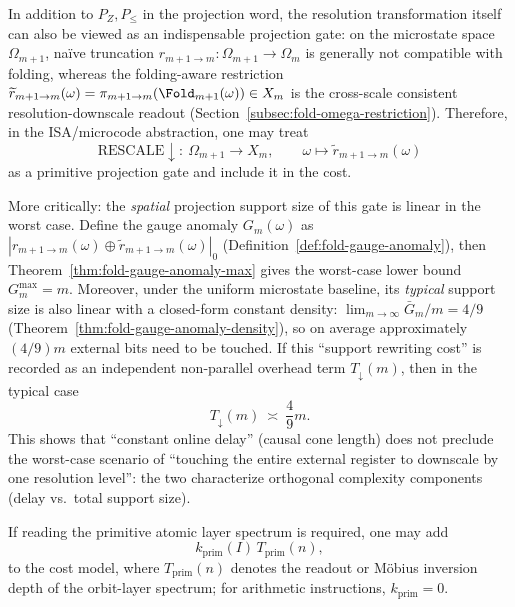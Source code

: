 \begin{remark}\label{rem:pom-rescale-gauge-anomaly}
In addition to \(P_Z,P_{\le}\) in the projection word, the resolution transformation itself can also be viewed as an indispensable projection gate: on the microstate space \(\Omega_{m+1}\), na\"ive truncation
\(
r_{m+1\to m}:\Omega_{m+1}\to\Omega_m
\)
is generally not compatible with folding, whereas the folding-aware restriction
\(
\widetilde r_{m+1\to m}(\omega)=\pi_{m+1\to m}(\Fold_{m+1}(\omega))\in X_m
\)
is the cross-scale consistent resolution-downscale readout (Section~\ref{subsec:fold-omega-restriction}).
Therefore, in the ISA/microcode abstraction, one may treat
$$
\mathrm{RESCALE}\downarrow:\ \Omega_{m+1}\to X_m,\qquad \omega\mapsto \widetilde r_{m+1\to m}(\omega)
$$
as a primitive projection gate and include it in the cost.
\par
More critically: the \emph{spatial} projection support size of this gate is linear in the worst case. Define the gauge anomaly \(G_m(\omega)\) as
\(
|r_{m+1\to m}(\omega)\oplus \widetilde r_{m+1\to m}(\omega)|_0
\)
(Definition~\ref{def:fold-gauge-anomaly}), then Theorem~\ref{thm:fold-gauge-anomaly-max} gives the worst-case lower bound \(G_m^{\max}=m\).
Moreover, under the uniform microstate baseline, its \emph{typical} support size is also linear with a closed-form constant density:
\(
\lim_{m\to\infty}\bar G_m/m=4/9
\)
(Theorem~\ref{thm:fold-gauge-anomaly-density}), so on average approximately \((4/9)m\) external bits need to be touched.
If this ``support rewriting cost'' is recorded as an independent non-parallel overhead term \(T_{\downarrow}(m)\), then in the typical case
\[
T_{\downarrow}(m)\ \asymp\ \frac{4}{9}m.
\]
This shows that ``constant online delay'' (causal cone length) does not preclude the worst-case scenario of ``touching the entire external register to downscale by one resolution level'': the two characterize orthogonal complexity components (delay vs.\ total support size).
\end{remark}

\begin{remark}\label{rem:pom-cost-prim}
If reading the primitive atomic layer spectrum is required, one may add
\[
k_{\mathrm{prim}}(I)\,T_{\mathrm{prim}}(n),
\]
to the cost model, where $T_{\mathrm{prim}}(n)$ denotes the readout or M\"obius inversion depth of the orbit-layer spectrum; for arithmetic instructions, $k_{\mathrm{prim}}=0$.
\end{remark}

